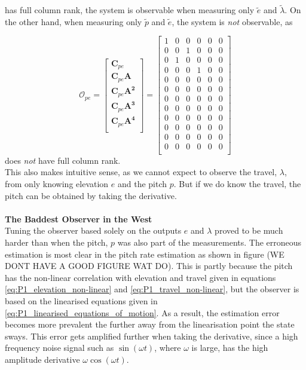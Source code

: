 has full column rank, the system is observable when measuring only $\tilde e$ and $\tilde \lambda$. On the other hand, when measuring only $\tilde p$ and $\tilde e$, the system is \textit{not} observable, as

\begin{equation}
    \mathbf{\mathcal{O}}_{pe} = 
        \begin{bmatrix}
        \mathbf{C}_{pe}               \\
        \mathbf{C}_{pe}\mathbf{A}     \\
        \mathbf{C}_{pe}\mathbf{A^2}   \\
        \mathbf{C}_{pe}\mathbf{A^3}   \\
        \mathbf{C}_{pe}\mathbf{A^4}   \\
    \end{bmatrix}
    = \begin{bmatrix}
    1 & 0 & 0 & 0 & 0 & 0 \\
    0 & 0 & 1 & 0 & 0 & 0 \\
    0 & 1 & 0 & 0 & 0 & 0 \\
    0 & 0 & 0 & 1 & 0 & 0 \\
    0 & 0 & 0 & 0 & 0 & 0 \\
    0 & 0 & 0 & 0 & 0 & 0 \\
    0 & 0 & 0 & 0 & 0 & 0 \\
    0 & 0 & 0 & 0 & 0 & 0 \\
    0 & 0 & 0 & 0 & 0 & 0 \\
    0 & 0 & 0 & 0 & 0 & 0 \\
    0 & 0 & 0 & 0 & 0 & 0 \\
    0 & 0 & 0 & 0 & 0 & 0 \\
    \end{bmatrix}
\end{equation}
does \textit{not} have full column rank.\\
This also makes intuitive sense, as we cannot expect to observe the travel, $\lambda$, from only knowing elevation $e$ and the pitch $p$. But if we do know the travel, the pitch can be obtained by taking the derivative.\\ 
\\
\textbf{The Baddest Observer in the West}\\
Tuning the observer based solely on the outputs $e$ and $\lambda$ proved to be much harder than when the pitch, $p$ was also part of the measurements. The erroneous estimation is most clear in the pitch rate estimation as shown in figure (WE DONT HAVE A GOOD FIGURE WAT DO). This is partly because the pitch has the non-linear correlation with elevation and travel given in equations \eqref{eq:P1_elevation_non-linear} and \eqref{eq:P1_travel_non-linear}, but the observer is based on the linearised equations given in \eqref{eq:P1_linearised_equations_of_motion}. As a result, the estimation error becomes more prevalent the further away from the linearisation point the state sways. This error gets amplified further when taking the derivative, since a high frequency noise signal such as $\sin(\omega t)$, where $\omega$ is large, has the high amplitude derivative $\omega \cos(\omega t)$. 
    